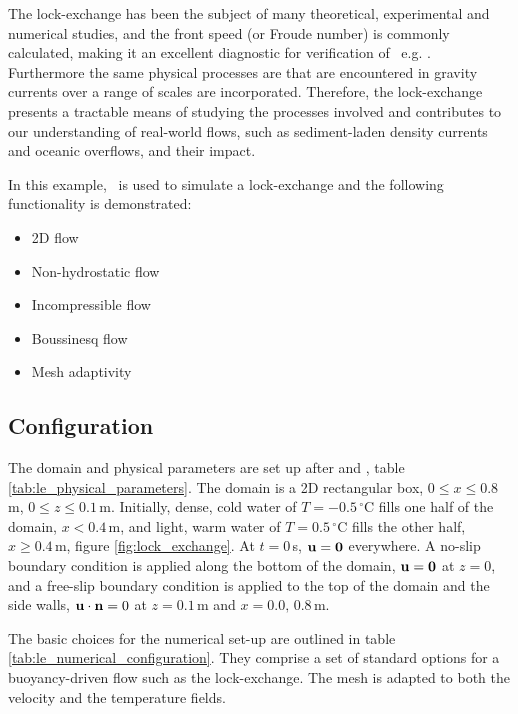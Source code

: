 The lock-exchange has been the subject of many theoretical, experimental and numerical studies, and the front speed (or Froude number) is commonly calculated, making it an excellent diagnostic for verification of \fluidity\, e.g. \citep{benjamin_68, klemp_94, hartel_00}. Furthermore the same physical processes are that are encountered in gravity currents over a range of scales are incorporated. Therefore, the lock-exchange presents a tractable means of studying the processes involved and contributes to our understanding of real-world flows, such as sediment-laden density currents and oceanic overflows, and their impact.

In this example, \fluidity\ is used to simulate a lock-exchange and the following functionality is demonstrated:

\begin{itemize}
\item 2D flow
\item Non-hydrostatic flow
\item Incompressible flow
\item Boussinesq flow
\item Mesh adaptivity

\end{itemize}

\subsection{Configuration}
\label{sect:lock_exchange_configuration}

The domain and physical parameters are set up after \cite{fringer_06} and \cite{ozgokmen_07}, table \ref{tab:le_physical_parameters}. The domain is a 2D rectangular box, $0\leq x \leq 0.8\,$m, $0 \leq z \leq 0.1\,$m. Initially, dense, cold water of $T = -0.5\,^\circ$C fills one half of the domain, $x<0.4\,$m, and light, warm water of $T = 0.5\,^\circ$C fills the other half, $x\geq0.4\,$m, figure \ref{fig:lock_exchange}. At $t=0\,$s, ${\bf u} = {\bf 0}$ everywhere. A no-slip boundary condition is applied along the bottom of the domain, ${\bf u = 0}$ at $z=0$, and a free-slip boundary condition is applied to the top of the domain and the side walls, ${\bf u\cdot\bf n} = 0$ at $z = 0.1\,$m and $x = 0.0,\, 0.8\,$m.

The basic choices for the numerical set-up are outlined in table \ref{tab:le_numerical_configuration}. They comprise a set of standard options for a buoyancy-driven flow such as the lock-exchange. The mesh is adapted to both the velocity and the temperature fields.  

